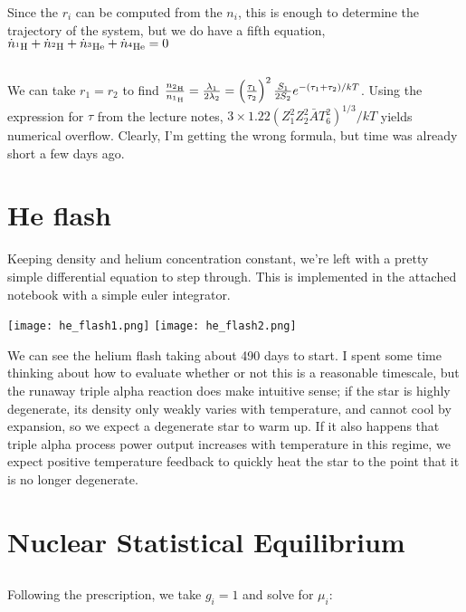 \documentclass[12pt]{article}
\newcommand{\pfrac}[2]{\left(\frac{#1}{#2} \right)}
\begin{document}
Since the \(r_i\) can be computed from the \(n_i\), this is enough to determine the trajectory of the system, but we do have a fifth equation, \(\dot{n}_{^{1}\mathrm{H}} + \dot{n}_{^{2}\mathrm{H}} +\dot{n}_{^{3}\mathrm{He}} +\dot{n}_{^{4}\mathrm{He}} = 0\)

\subsection{}

We can take \(r_1 = r_2\) to find \(  \frac{\nc{2}{H}}{\nc{1}{H}} = \frac{\lambda_1}{2\lambda_2} = \pfrac{\tau_1}{\tau_2}^2\frac{S_1}{2S_2}e^{-(\tau_1+\tau_2)/kT}\). Using the expression for \(\tau\) from the lecture notes, \(3 \times 1.22(Z_1^2 Z_2^2 \bar{A} T_6^2)^{1/3}/kT \) yields numerical overflow. Clearly, I'm getting the wrong formula, but time was already short a few days ago.

\section{He flash}

Keeping density and helium concentration constant, we're left with a pretty simple differential equation to step through. This is implemented in the attached notebook with a simple euler integrator.

\texttt{[image: he\_flash1.png]}
\texttt{[image: he\_flash2.png]}

We can see the helium flash taking about 490 days to start. I spent some time thinking about how to evaluate whether or not this is a reasonable timescale, but the runaway triple alpha reaction does make intuitive sense; if the star is highly degenerate, its density    only weakly varies with temperature, and cannot cool by expansion, so we expect a degenerate star to warm up. If it also happens that triple alpha process power output increases with temperature in this regime, we expect positive temperature feedback to quickly heat the star to the point that it is no longer degenerate.




\section{Nuclear Statistical Equilibrium}
\subsection{}

Following the prescription, we take \(g_i = 1\) and solve for \(\mu_i\):
\end{document}

